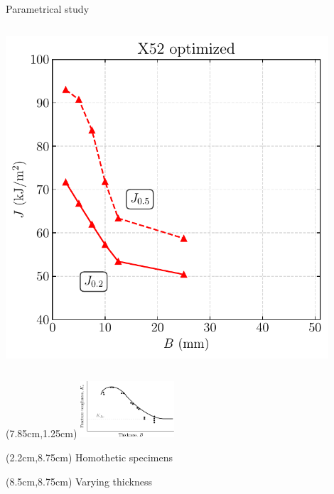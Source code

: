 \documentclass[9pt]{beamer}
\begin{document}
\begin{frame}{Parametrical study}
\begin{columns}
        \centering
        \includegraphics[width=0.9\textwidth]{Images/plot_geoJ_12_5_1_2__1_4.pdf}
    \end{columns}

    \begin{textblock*}{3cm}(7.85cm,1.25cm) %
        \includegraphics[width=3.5cm]{Images/bump.pdf}
    \end{textblock*}

    \begin{textblock*}{5cm}(2.2cm,8.75cm)
        \small Homothetic specimens
    \end{textblock*}

    \begin{textblock*}{5cm}(8.5cm,8.75cm)
        \small Varying thickness
    \end{textblock*}
    
\end{frame}

\end{document}
